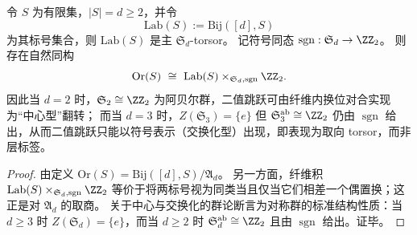 \begin{proposition}\label{prop:uplift-fiber-sign-dimension-reduction}
令 \(S\) 为有限集，\(|S|=d\ge 2\)，并令
\[
\mathrm{Lab}(S):=\mathrm{Bij}([d],S)
\]
为其标号集合，则 \(\mathrm{Lab}(S)\) 是主 \(\mathfrak{S}_d\)-torsor。
记符号同态 \(\operatorname{sgn}:\mathfrak{S}_d\to \ZZ_2\)。
则存在自然同构
\[
\mathrm{Or}(S)\ \cong\ \mathrm{Lab}(S)\times_{\mathfrak{S}_d,\operatorname{sgn}}\ZZ_2.
\]
因此当 \(d=2\) 时，\(\mathfrak{S}_2\cong\ZZ_2\) 为阿贝尔群，二值跳跃可由纤维内换位对合实现为“中心型”翻转；
而当 \(d=3\) 时，\(Z(\mathfrak{S}_3)=\{e\}\) 但 \(\mathfrak{S}_3^{\mathrm{ab}}\cong\ZZ_2\) 仍由 \(\operatorname{sgn}\) 给出，从而二值跳跃只能以符号表示（交换化型）出现，即表现为取向 torsor，而非层标签。
\end{proposition}

\begin{proof}
由定义 \(\mathrm{Or}(S)=\mathrm{Bij}([d],S)/\mathfrak{A}_d\)。
另一方面，纤维积 \(\mathrm{Lab}(S)\times_{\mathfrak{S}_d,\operatorname{sgn}}\ZZ_2\) 等价于将两标号视为同类当且仅当它们相差一个偶置换；这正是对 \(\mathfrak{A}_d\) 的取商。
关于中心与交换化的群论断言为对称群的标准结构性质：当 \(d\ge 3\) 时 \(Z(\mathfrak{S}_d)=\{e\}\)，而当 \(d\ge 2\) 时 \(\mathfrak{S}_d^{\mathrm{ab}}\cong\ZZ_2\) 且由 \(\operatorname{sgn}\) 给出。证毕。
\end{proof}
